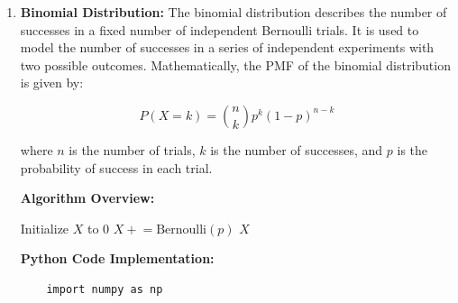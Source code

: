 \documentclass[12pt]{book} %
\begin{document}
\begin{enumerate}
    where \(p\) is the probability of success.
\textbf{Algorithm Overview:}
    \FloatBarrier
\begin{algorithm}
\caption{Generating Random Numbers from a Bernoulli Distribution}
\begin{algorithmic}[1]
    \State Generate a random number \(U\) from the uniform distribution on the interval \([0, 1]\)
        \State {}
    \Else
        \State {}
    \EndIf
\EndProcedure
\end{algorithmic}
\end{algorithm}
\FloatBarrier
\textbf{Python Code Implementation:}
\FloatBarrier
\begin{lstlisting}
    import random

def Bernoulli(p):
    # Generate a random number U from the uniform distribution on the interval [0, 1]
    U = random.random()
    # Check if U is less than p
    if U < p:
        return 1
    else:
        return 0

# Example usage:
p = 0.5  # Probability of success
result = Bernoulli(p)
print("Random number generated from Bernoulli distribution:", result)
\end{lstlisting}
    
    \item \textbf{Binomial Distribution:} The binomial distribution describes the number of successes in a fixed number of independent Bernoulli trials. It is used to model the number of successes in a series of independent experiments with two possible outcomes. Mathematically, the PMF of the binomial distribution is given by:
    
    \[
    P(X=k) = \binom{n}{k} p^k (1-p)^{n-k}
    \]
    
    where \(n\) is the number of trials, \(k\) is the number of successes, and \(p\) is the probability of success in each trial.

\textbf{Algorithm Overview:}
    \FloatBarrier
\begin{algorithm}
\caption{Generating Random Numbers from a Binomial Distribution}
\begin{algorithmic}[1]
    \State Initialize \(X\) to 0
        \State \(X \mathrel{+}= \text{Bernoulli}(p)\)
    \EndFor
    \State \Return \(X\)
\EndProcedure
\end{algorithmic}
\end{algorithm}
\FloatBarrier
\textbf{Python Code Implementation:}
\FloatBarrier
\begin{lstlisting}
    import numpy as np


\end{lstlisting}
\end{enumerate}
\end{document}
